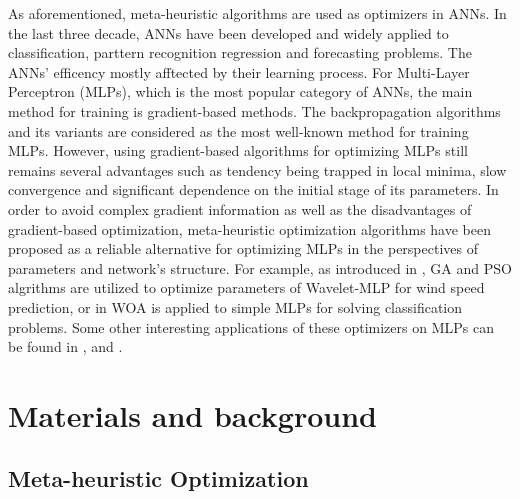 \documentclass[a4paper,13pt,2p]{report}
\begin{document}
	As aforementioned, meta-heuristic algorithms are used as optimizers in ANNs. In the last three decade, ANNs have been developed and widely applied to classification, parttern recognition regression and forecasting problems. The ANNs' efficency mostly afftected by their learning process. For Multi-Layer Perceptron (MLPs), which is the most popular category of ANNs, the main method for training is gradient-based methods. The backpropagation algorithms and its variants \cite{ruder2016overview} are considered as the most well-known method for training MLPs. However, using gradient-based algorithms for optimizing MLPs still remains several advantages such as tendency being trapped in local minima, slow convergence and significant dependence on the initial stage of its parameters. In order to avoid complex gradient information as well as the disadvantages of gradient-based optimization, meta-heuristic optimization algorithms have been proposed as a reliable alternative for optimizing MLPs in the perspectives of parameters and network's structure. For example, as introduced in \cite{liu2013experimental}, GA and PSO algrithms are utilized to optimize parameters of Wavelet-MLP for wind speed prediction, or in \cite{aljarah2018optimizing} WOA is applied to simple MLPs for solving classification problems. Some other interesting applications of these optimizers on MLPs can be found in \cite{castillo2000g}, \cite{nasseri2008optimized} and \cite{kawam2012metaheuristic}.
	
		
	 

\chapter{Materials and background}
\label{ch:background}


\section{Meta-heuristic Optimization}
\label{sec:meta_heuristic}	
	
\end{document}
